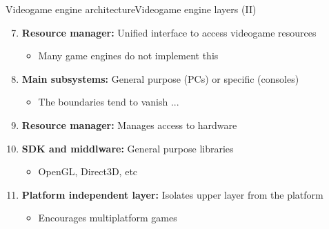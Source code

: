 \documentclass[10pt,compress]{beamer} %
\begin{document}
\begin{frame}[plain]{Videogame engine architecture}{Videogame engine layers (II)}
	\begin{enumerate}
	\setcounter{enumi}{6}
	\item \textbf{Resource manager:} Unified interface to access videogame resources
		\begin{itemize}
		\item Many game engines do not implement this
		\end{itemize}
	\item \textbf{Main subsystems:} General purpose (PCs) or specific (consoles)
		\begin{itemize}
		\item The boundaries tend to vanish ...
		\end{itemize}
	\item \textbf{Resource manager:} Manages access to hardware
	\item \textbf{SDK and middlware:} General purpose libraries
		\begin{itemize}
		\item OpenGL, Direct3D, etc
		\end{itemize}
	\item \textbf{Platform independent layer:} Isolates upper layer from the platform
		\begin{itemize}
		\item Encourages multiplatform games
		\end{itemize}
	\end{enumerate}
\end{frame}
\end{document}
